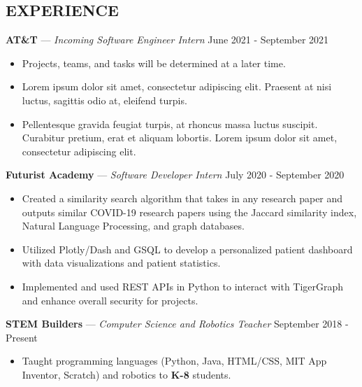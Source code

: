 \documentclass[11pt]{res}
\begin{document}
\begin{footnotesize}
\begin{resume}
\begin{small}
\section{EXPERIENCE}
\end{small}
\vspace{.5mm}
\textbf{AT\&T} — {\sl Incoming Software Engineer Intern} \hfill June 2021 - September 2021\vspace{-4.5mm}
\begin{itemize}[leftmargin=6.25mm] \itemsep -2pt 
\item Projects, teams, and tasks will be determined at a later time. 
\vspace{1.30mm}
\item Lorem ipsum dolor sit amet, consectetur adipiscing elit. Praesent at nisi luctus, sagittis odio at, eleifend turpis.
\vspace{1.30mm}
\item Pellentesque gravida feugiat turpis, at rhoncus massa luctus suscipit. Curabitur pretium, erat et aliquam lobortis. Lorem ipsum dolor sit amet, consectetur adipiscing elit.
\end{itemize}
\vspace{-2.5mm}
\textbf{Futurist Academy} — {\sl Software Developer Intern} \hfill July 2020 - September 2020\vspace{-4.5mm}
\begin{itemize}[leftmargin=6.25mm] \itemsep -2pt 
\item  Created a similarity search algorithm that takes in any research paper and outputs similar COVID-19 research papers using the Jaccard similarity index, Natural Language Processing, and graph databases.
\vspace{1.30mm}
\item Utilized Plotly/Dash and GSQL to develop a personalized patient dashboard with data visualizations and patient statistics.
\vspace{1.30mm}
\item Implemented and used REST APIs in Python to interact with TigerGraph and enhance overall security for projects.
\end{itemize}
\vspace{-2.5mm}
\textbf{STEM Builders} — {\sl Computer Science and Robotics Teacher} \hfill September 2018 - Present\vspace{-4.5mm}
\begin{itemize}[leftmargin=6.25mm] \itemsep -2pt 
\item Taught programming languages (Python, Java, HTML/CSS, MIT App Inventor, Scratch) and robotics to \textbf{K-8} students. 

\end{itemize}
\end{resume}
\end{footnotesize}
\end{document}
